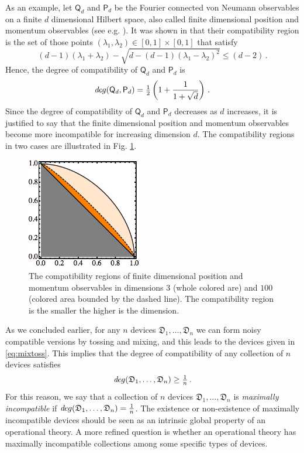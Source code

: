 \documentclass[12pt]{article}
\theoremstyle{definition}
\newcommand{\half}{\tfrac{1}{2}} %
\newcommand{\Po}{\mathsf{P}}%
\newcommand{\Qo}{\mathsf{Q}}%
\newcommand{\Dev}{\mathfrak{D}} %
\def\deg{\textit de\kern-.5pt g}
\begin{document}
As an example, let $\Qo_d$ and $\Po_d$ be the Fourier connected von Neumann observables on a finite $d$ dimensional Hilbert space, also called  finite dimensional position and momentum observables (see e.g. \cite{Vourdas97}).
It was shown in \cite{CaHeTo12} that their compatibility region is the set of those points $(\lambda_1,\lambda_2)\in [0,1]\times[0,1]$ that satisfy
\begin{equation}\label{eq:lambda}
(d-1) (\lambda_1 + \lambda_2) -  \sqrt{d  - (d-1) (\lambda_1 - \lambda_2)^2}\leq (d-2) \, .
\end{equation}
Hence, the degree of compatibility of $\Qo_d$ and $\Po_d$ is
\begin{equation}\label{eq:pos-mom}
\deg(\Qo_d,\Po_d) = \half \left( 1 + \frac{1}{1+\sqrt{d}} \right) \, .
\end{equation}
Since the degree of compatibility of $\Qo_d$ and $\Po_d$ decreases as $d$ increases, it is justified to say that the finite dimensional position and momentum observables become more incompatible for increasing dimension $d$.
The compatibility regions in two cases are illustrated in Fig. \ref{fig:dim}.

\begin{figure}\begin{center}
\includegraphics[width=5cm]{fig_regiondim.png}
\caption{The compatibility regions of finite dimensional position and momentum observables in dimensions $3$ (whole colored are) and $100$ (colored area bounded by the dashed line).
The compatibility region is the smaller the higher is the dimension.}
\label{fig:dim}
\end{center}
\end{figure}
 
As we concluded earlier, for any $n$ devices $\Dev_1,\ldots,\Dev_n$ we can form noisy compatible versions by tossing and mixing, and this leads to the devices given in \eqref{eq:mixtoss}.
This implies that the degree of compatibility of any collection of $n$ devices satisfies 
\begin{equation}
\deg(\Dev_1,\ldots,\Dev_n) \geq \tfrac{1}{n} \, .
\end{equation}
For this reason, we say that a collection of $n$ devices $\Dev_1,\ldots,\Dev_n$ is \emph{maximally incompatible} if $\deg(\Dev_1,\ldots,\Dev_n) = \tfrac{1}{n}$. 
The existence or non-existence of maximally incompatible devices should be seen as an intrinsic global property of an operational theory. 
A more refined question is whether an operational theory has maximally incompatible collections among some specific types of devices. 
\end{document}
